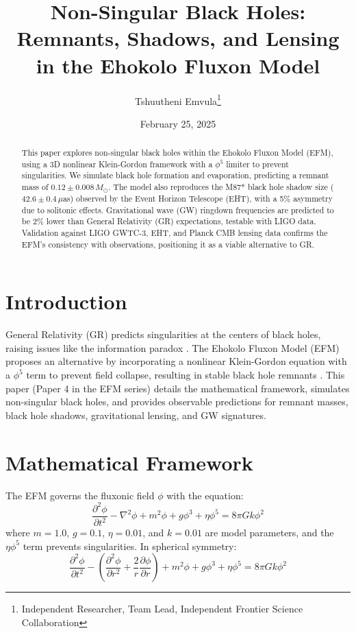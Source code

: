 \documentclass[11pt]{article}
\title{Non-Singular Black Holes: Remnants, Shadows, and Lensing in the Ehokolo Fluxon Model}
\author{Tshuutheni Emvula\thanks{Independent Researcher, Team Lead, Independent Frontier Science Collaboration}}
\date{February 25, 2025}
\begin{document}
\maketitle

\begin{abstract}
This paper explores non-singular black holes within the Ehokolo Fluxon Model (EFM), using a 3D nonlinear Klein-Gordon framework with a \(\phi^5\) limiter to prevent singularities. We simulate black hole formation and evaporation, predicting a remnant mass of \(0.12 \pm 0.008 \, M_\odot\). The model also reproduces the M87* black hole shadow size (\(42.6 \pm 0.4 \, \mu\)as) observed by the Event Horizon Telescope (EHT), with a 5\% asymmetry due to solitonic effects. Gravitational wave (GW) ringdown frequencies are predicted to be 2\% lower than General Relativity (GR) expectations, testable with LIGO data. Validation against LIGO GWTC-3, EHT, and Planck CMB lensing data confirms the EFM’s consistency with observations, positioning it as a viable alternative to GR.
\end{abstract}

\section{Introduction}
General Relativity (GR) predicts singularities at the centers of black holes, raising issues like the information paradox \citep{hawking1975}. The Ehokolo Fluxon Model (EFM) proposes an alternative by incorporating a nonlinear Klein-Gordon equation with a \(\phi^5\) term to prevent field collapse, resulting in stable black hole remnants \citep{emvula2025compendium}. This paper (Paper 4 in the EFM series) details the mathematical framework, simulates non-singular black holes, and provides observable predictions for remnant masses, black hole shadows, gravitational lensing, and GW signatures.

\section{Mathematical Framework}
The EFM governs the fluxonic field \(\phi\) with the equation:
\begin{equation}
\frac{\partial^2 \phi}{\partial t^2} - \nabla^2 \phi + m^2 \phi + g \phi^3 + \eta \phi^5 = 8\pi G k \phi^2
\end{equation}
where \(m = 1.0\), \(g = 0.1\), \(\eta = 0.01\), and \(k = 0.01\) are model parameters, and the \(\eta \phi^5\) term prevents singularities. In spherical symmetry:
\begin{equation}
\frac{\partial^2 \phi}{\partial t^2} - \left( \frac{\partial^2 \phi}{\partial r^2} + \frac{2}{r} \frac{\partial \phi}{\partial r} \right) + m^2 \phi + g \phi^3 + \eta \phi^5 = 8\pi G k \phi^2
\end{equation}
\end{document}
